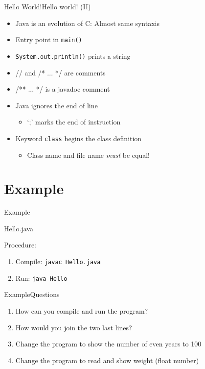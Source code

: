 \documentclass[10pt,compress]{beamer} %
\begin{document}
\begin{frame}{Hello World!}{Hello world! (II)}
	\begin{itemize}
		\item Java is an evolution of C: Almost same syntaxis
     	\item Entry point in \texttt{main()}
		\item \texttt{System.out.println()} prints a string
		\item // and /* ... */ are comments
		\item /** ... */ is a \alert{javadoc} comment
		\item Java ignores the end of line
	    	\begin{itemize}
		 	\item `;' marks the end of instruction
 		 	\end{itemize}
		\item Keyword \texttt{class} begins the class definition
	    	\begin{itemize}
		 	\item Class name and file name \textit{must} be equal!
 		 	\end{itemize}
	\end{itemize}
\end{frame}

\section[Example]{Example}
\begin{frame}{Example}
	\vspace{-0.2cm}
	\begin{block}{Hello.java}
		
	\end{block}

	Procedure:
	\begin{enumerate}
		\item Compile: \texttt{javac Hello.java}
		\item Run: \texttt{java Hello}
	\end{enumerate}
\end{frame}

\begin{frame}{Example}{Questions}
	\begin{enumerate}
		\item How can you compile and run the program?
		\item How would you join the two last lines?
		\item Change the program to show the number of even years to 100
		\item Change the program to read and show weight (float number)
	\end{enumerate}
\end{frame}
\end{document}
